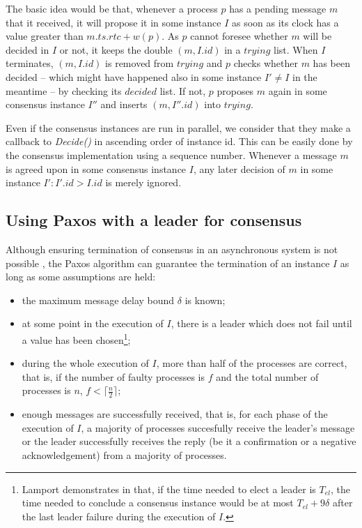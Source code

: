 \documentclass[times, 10pt]{article}
\begin{document}
The basic idea would be that, whenever a process $p$ has a pending message $m$ that it received, it will propose it in some instance $I$ as soon as its clock has a value greater than $m.ts.rtc + w(p)$. As $p$ cannot foresee whether $m$ will be decided in $I$ or not, it keeps the double $(m,I.id)$ in a $trying$ list. When $I$ terminates, $(m,I.id)$ is removed from $trying$ and $p$ checks whether $m$ has been decided -- which might have happened also in some instance $I' \neq I$ in the meantime -- by checking its $decided$ list. If not, $p$ proposes $m$ again in some consensus instance $I''$ and inserts $(m,I''.id)$ into $trying$.

Even if the consensus instances are run in parallel, we consider that they make a callback to \emph{Decide()} in ascending order of instance id. This can be easily done by the consensus implementation using a sequence number. Whenever a message $m$ is agreed upon in some consensus instance $I$, any later decision of $m$ in some instance \mbox{$I' : I'.id > I.id$} is merely ignored.



\subsection{Using Paxos with a leader for consensus}
\label{sec:paxos}

Although ensuring termination of consensus in an asynchronous system is not possible \cite{fischer1985idc}, the Paxos \cite{lamport1998ptp} algorithm can guarantee the termination of an instance $I$ as long as some assumptions are held:

\begin{itemize}
  \item the maximum message delay bound $\delta$ is known;
  \item at some point in the execution of $I$, there is a leader which does not fail until a value has been chosen\footnote{Lamport demonstrates in \cite{lamport1998ptp} that, if the time needed to elect a leader is $T_{el}$, the time needed to conclude a consensus instance would be at most $T_{el} + 9\delta$ after the last leader failure during the execution of $I$.};
  \item during the whole execution of $I$, more than half of the processes are correct, that is, if the number of faulty processes is $f$ and the total number of processes is $n$, $f < \lceil \frac{n}{2} \rceil$;
  \item enough messages are successfully received, that is, for each phase of the execution of $I$, a majority of processes succesfully receive the leader's message or the leader successfully receives the reply (be it a confirmation or a negative acknowledgement) from a majority of processes.
\end{itemize}
\end{document}
